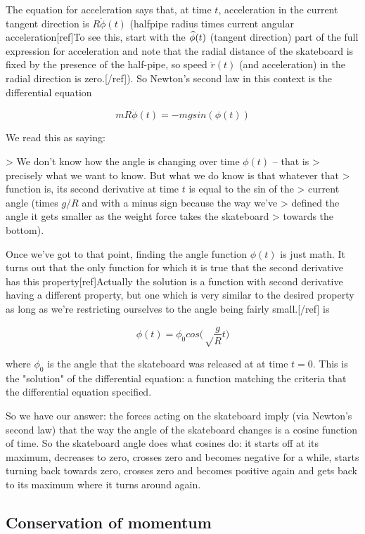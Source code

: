 The equation for acceleration says that, at time $t$, acceleration in the
current tangent direction is $R\ddot \phi(t)$ (halfpipe radius times current
angular acceleration[ref]To see this, start with the $\mathbf{\widehat{\phi}}(t)$ (tangent
direction) part of the full expression for acceleration and note that the
radial distance of the skateboard is fixed by the presence of the half-pipe, so
speed $\dot r(t)$ (and acceleration) in the radial direction is
zero.[/ref]). So Newton's second law in this context is the differential
equation

$$mR \ddot \phi(t) = -mg sin(\phi(t))$$

We read this as saying:

> We don't know how the angle is changing over time $\phi(t)$ -- that is
> precisely what we want to know. But what we do know is that whatever that
> function is, its second derivative at time $t$ is equal to the sin of the
> current angle (times $g/R$ and with a minus sign because the way we've
> defined the angle it gets smaller as the weight force takes the skateboard
> towards the bottom).

Once we've got to that point, finding the angle function $\phi(t)$ is just
math. It turns out that the only function for which it is true that the second
derivative has this property[ref]Actually the solution is a function with
second derivative having a different property, but one which is very similar to
the desired property as long as we're restricting ourselves to the angle being
fairly small.[/ref] is

$$\phi(t) = \phi_0 cos\bigg(\sqrt\frac{g}{R}t\bigg)$$

where $\phi_0$ is the angle that the skateboard was released at at time $t=0$.
This is the "solution" of the differential equation: a function matching the
criteria that the differential equation specified.

So we have our answer: the forces acting on the skateboard imply (via Newton's
second law) that the way the angle of the skateboard changes is a cosine
function of time. So the skateboard angle does what cosines do: it starts off
at its maximum, decreases to zero, crosses zero and becomes negative for a
while, starts turning back towards zero, crosses zero and becomes positive
again and gets back to its maximum where it turns around again.


\subsection{Conservation of momentum}

